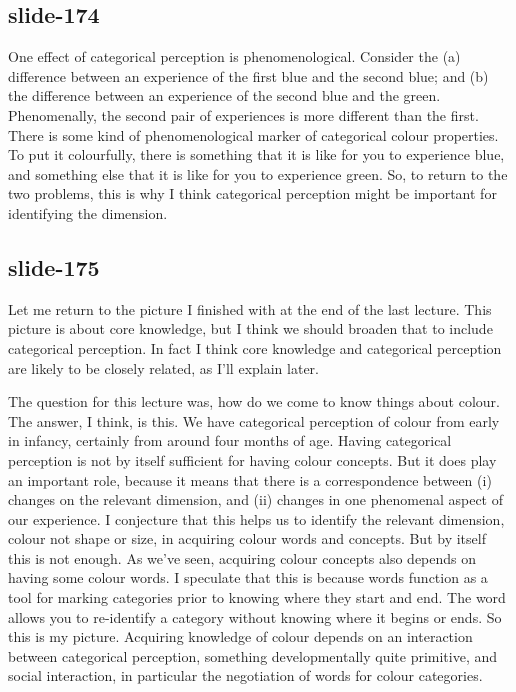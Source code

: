 \documentclass[12pt,\papersize]{extarticle}
\begin{document}
 
\subsection{slide-174}
One effect of categorical perception is phenomenological.
Consider the (a) difference between an experience of the first blue and the second blue;
and (b) the difference between an experience of the second blue and the green.
Phenomenally, the second pair of experiences is more different than the first.
There is some kind of phenomenological marker of categorical colour properties.
To put it colourfully, there is something that it is like for you to experience blue, and something else that it is like for you to experience green.
So, to return to the two problems, this is why I think categorical perception might be important for identifying the dimension.
 
 
\subsection{slide-175}
Let me return to the picture I finished with at the end of the last lecture.
This picture is about core knowledge, but I think we should broaden that to include categorical perception.
In fact I think core knowledge and categorical perception are likely to be closely related, as I'll explain later.
 
The question for this lecture was, how do we come to know things about colour.
The answer, I think, is this.
We have categorical perception of colour from early in infancy, certainly from around four months of age.
Having categorical perception is not by itself sufficient for having colour concepts.
But it does play an important role, because it means that there is a correspondence between (i) changes on the relevant dimension, and (ii) changes in one phenomenal aspect of our experience.
I conjecture that this helps us to identify the relevant dimension, colour not shape or size, in acquiring colour words and concepts.
But by itself this is not enough.
As we've seen, acquiring colour concepts also depends on having some colour words.
I speculate that this is because words function as a tool for marking categories prior to knowing where they start and end.
The word allows you to re-identify a category without knowing where it begins or ends.
So this is my picture.
Acquiring knowledge of colour depends on an interaction between categorical perception, something developmentally quite primitive, and social interaction, in particular the negotiation of words for colour categories.
 
\end{document}
